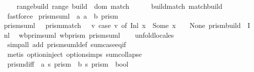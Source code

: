 \begin{isabellebody}
\ \ \isamarkupfalse%
\ range{\isacharunderscore}build{\isacharcolon}\ {\isachardoublequoteopen}range\ build\ {\isacharequal}\ dom\ match{\isachardoublequoteclose}\isanewline
%
\isadelimproof
\ \ \ \ %
\endisadelimproof
%
\isatagproof
{}\isamarkupfalse%
\ build{\isacharunderscore}match\ match{\isacharunderscore}build\ \isamarkupfalse%
\ fastforce%
\endisatagproof
{\isafoldproof}%
%
\isadelimproof
\isanewline
%
\endisadelimproof
{}\isamarkupfalse%
\isanewline
\isanewline
{}\isamarkupfalse%
\ prism{\isacharunderscore}suml\ {\isacharcolon}{\isacharcolon}\ {\isachardoublequoteopen}{\isacharparenleft}{\isacharprime}a{\isacharcomma}\ {\isacharprime}a\ {\isacharplus}\ {\isacharprime}b{\isacharparenright}\ prism{\isachardoublequoteclose}\ \isanewline
{\isachardoublequoteopen}prism{\isacharunderscore}suml\ {\isacharequal}\ {\isasymlparr}\ prism{\isacharunderscore}match\ {\isacharequal}\ {\isacharparenleft}{\isasymlambda}\ v{\isachardot}\ case\ v\ of\ Inl\ x\ {\isasymRightarrow}\ Some\ x\ {\isacharbar}\ {\isacharunderscore}\ {\isasymRightarrow}\ None{\isacharparenright}{\isacharcomma}\ prism{\isacharunderscore}build\ {\isacharequal}\ Inl\ {\isasymrparr}{\isachardoublequoteclose}\isanewline
\isanewline
{}\isamarkupfalse%
\ wb{\isacharunderscore}prim{\isacharunderscore}suml{\isacharcolon}\ {\isachardoublequoteopen}wb{\isacharunderscore}prism\ prism{\isacharunderscore}suml{\isachardoublequoteclose}\isanewline
%
\isadelimproof
\ \ %
\endisadelimproof
%
\isatagproof
{}\isamarkupfalse%
\ {\isacharparenleft}unfold{\isacharunderscore}locales{\isacharparenright}\isanewline
\ \ \isamarkupfalse%
\ {\isacharparenleft}simp{\isacharunderscore}all\ add{\isacharcolon}\ prism{\isacharunderscore}suml{\isacharunderscore}def\ sum{\isachardot}case{\isacharunderscore}eq{\isacharunderscore}if{\isacharparenright}\isanewline
\ \ \isamarkupfalse%
\ {\isacharparenleft}metis\ option{\isachardot}inject\ option{\isachardot}simps{\isacharparenleft}{}{\isacharparenright}\ sum{\isachardot}collapse{\isacharparenleft}{}{\isacharparenright}{\isacharparenright}\isanewline
{}\isamarkupfalse%
%
\endisatagproof
{\isafoldproof}%
%
\isadelimproof
\isanewline
%
\endisadelimproof
\ \ \isanewline
{}\isamarkupfalse%
\ prism{\isacharunderscore}diff\ {\isacharcolon}{\isacharcolon}\ {\isachardoublequoteopen}{\isacharparenleft}{\isacharprime}a{\isacharcomma}\ {\isacharprime}s{\isacharparenright}\ prism\ {\isasymRightarrow}\ {\isacharparenleft}{\isacharprime}b{\isacharcomma}\ {\isacharprime}s{\isacharparenright}\ prism\ {\isasymRightarrow}\ bool{\isachardoublequoteclose}\ {\isacharparenleft}\ {\isachardoublequoteopen}{\isasymnabla}{\isachardoublequoteclose}\ {}{}{\isacharparenright}\ \isanewline

\end{isabellebody}
